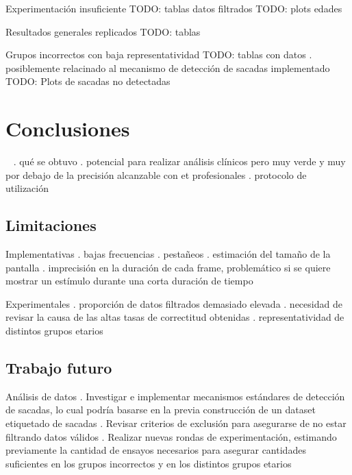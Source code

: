 \documentclass[aspectratio=169]{beamer}
\begin{document}
\begin{frame}{Experimentación insuficiente}
TODO: tablas datos filtrados
TODO: plots edades
\end{frame}

\begin{frame}{Resultados generales replicados}
TODO: tablas
\end{frame}

\begin{frame}{Grupos incorrectos con baja representatividad}
TODO: tablas con datos
. posiblemente relacinado al mecanismo de detección de sacadas implementado
TODO: Plots de sacadas no detectadas
\end{frame}

\section{Conclusiones}

\begin{frame}{~}
. qué se obtuvo
. potencial para realizar análisis clínicos pero muy verde y muy por debajo de
  la precisión alcanzable con et profesionales
. protocolo de utilización
\end{frame}

\subsection{Limitaciones}

\begin{frame}{Implementativas}
. bajas frecuencias
. pestañeos
. estimación del tamaño de la pantalla
. imprecisión en la duración de cada frame, problemático si se quiere mostrar
  un estímulo durante una corta duración de tiempo
\end{frame}

\begin{frame}{Experimentales}
. proporción de datos filtrados demasiado elevada
. necesidad de revisar la causa de las altas tasas de correctitud obtenidas
. representatividad de distintos grupos etarios
\end{frame}

\subsection{Trabajo futuro}

\begin{frame}{Análisis de datos}
. Investigar e implementar mecanismos estándares de detección de sacadas, lo
  cual podría basarse en la previa construcción de un dataset etiquetado de
  sacadas
. Revisar criterios de exclusión para asegurarse de no estar filtrando datos
  válidos
. Realizar nuevas rondas de experimentación, estimando previamente la cantidad
  de ensayos necesarios para asegurar cantidades suficientes en los grupos
  incorrectos y en los distintos grupos etarios
\end{frame}
\end{document}
